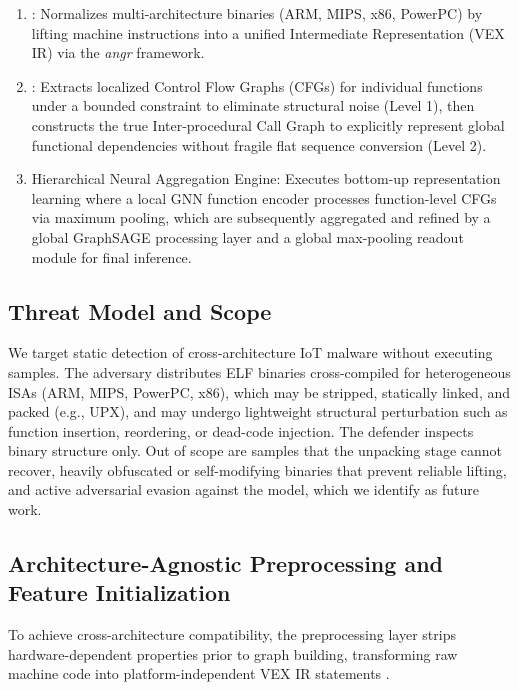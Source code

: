 \documentclass{llncs}
\begin{document}
\begin{enumerate}
    \item {}: Normalizes multi-architecture binaries (ARM, MIPS, x86, PowerPC) by lifting machine instructions into a unified Intermediate Representation (VEX IR) via the \textit{angr} framework.
    \item {}: Extracts localized Control Flow Graphs (CFGs) for individual functions under a bounded constraint to eliminate structural noise (Level 1), then constructs the true Inter-procedural Call Graph to explicitly represent global functional dependencies without fragile flat sequence conversion (Level 2).
    \item Hierarchical Neural Aggregation Engine: Executes bottom-up representation learning where a local GNN function encoder processes function-level CFGs via maximum pooling, which are subsequently aggregated and refined by a global GraphSAGE processing layer and a global max-pooling readout module for final inference.
\end{enumerate}


\subsection{Threat Model and Scope}
We target static detection of cross-architecture IoT malware without executing samples. The adversary distributes ELF binaries cross-compiled for heterogeneous
ISAs (ARM, MIPS, PowerPC, x86), which may be stripped, statically linked, and packed (e.g., UPX), and
may undergo lightweight structural perturbation such as function insertion, reordering, or dead-code
injection. The defender inspects binary structure only. Out of scope are samples that the unpacking
stage cannot recover, heavily obfuscated or self-modifying binaries that prevent reliable lifting, and
active adversarial evasion against the model, which we identify as future work.


\subsection{Architecture-Agnostic Preprocessing and Feature Initialization}
To achieve cross-architecture compatibility, the preprocessing layer strips hardware-dependent properties prior to graph building, transforming raw machine code into platform-independent VEX IR statements \cite{angr2016}.
\end{document}
